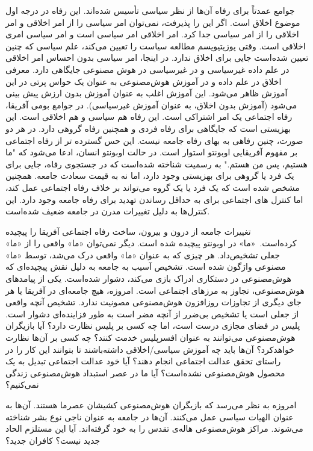 جوامع عمدتاً برای رفاه آن‌ها از نظر سیاسی تأسیس شده‌اند.
این رفاه در درجه اول موضوع اخلاق است.
اگر این را پذیرفت، نمی‌توان امر سیاسی را از امر اخلاقی و امر اخلاقی را از امر سیاسی جدا کرد.
امر اخلاقی امر سیاسی است و امر سیاسی امری اخلاقی است.
وقتی پوزیتیویسم مطالعه سیاست را تعیین می‌کند، علم سیاسی که چنین تعیین شده‌است جایی برای اخلاق ندارد.
در اینجا، امر سیاسی بدون احساس امر اخلاقی در علم داده غیرسیاسی و در غیرسیاسی در هوش مصنوعی جایگاهی دارد.
معرفی اخلاق در علم داده و در آموزش هوش‌مصنوعی به عنوان یک حواس پرتی در این آموزش ظاهر می‌شود.
این آموزش اغلب به عنوان آموزش بدون ارزش پیش بینی می‌شود (آموزش بدون اخلاق، به عنوان آموزش غیرسیاسی).
در جوامع بومی آفریقا، رفاه اجتماعی یک امر اشتراکی است.
این رفاه هم سیاسی و هم اخلاقی است.
این بهزیستی است که جایگاهی برای رفاه فردی و همچنین رفاه گروهی دارد.
در هر دو صورت، چنین رفاهی به بهای رفاه جامعه نیست.
این حس گسترده تر از رفاه اجتماعی بر مفهوم آفریقایی اوبونتو استوار است.
در حالت اوبونتو انسان، ادعا می‌شود که "ما هستیم، پس من هستم." به رسمیت شناخته شده‌است که در جستجوی رفاه، جایی برای یک فرد یا گروهی برای بهزیستی وجود دارد، اما نه به قیمت سعادت جامعه.
همچنین مشخص شده است که یک فرد یا یک گروه می‌تواند بر خلاف رفاه اجتماعی عمل کند، اما کنترل های اجتماعی برای به حداقل رساندن تهدید برای رفاه جامعه وجود دارد.
این کنترل‌ها به دلیل تغییرات مدرن در جامعه ضعیف شده‌است.

تغییرات جامعه از درون و بیرون، ساخت رفاه اجتماعی آفریقا را پیچیده کرده‌است.\ «ما» در اوبونتو پیچیده شده است.
دیگر نمی‌توان «ما» واقعی را از «ما» جعلی تشخیص‌داد.
هر چیزی که به عنوان «ما» واقعی درک می‌شد، توسط «ما» مصنوعی واژگون شده است.
تشخیص آسیب به جامعه به دلیل نقش پیچیده‌ای که هوش‌مصنوعی در دستکاری ادراک بازی می‌کند، دشوار شده‌است.
یکی از پیامدهای هوش‌مصنوعی، تجاوز به مرزهای اجتماعی است.
امروزه، هیچ جامعه‌ای در آفریقا یا هر جای دیگری از تجاوزات روزافزون هوش‌مصنوعی مصونیت ندارد.
تشخیص آنچه واقعی از جعلی است یا تشخیص بی‌ضرر از آنچه مضر است به طور فزاینده‌ای دشوار است.
پلیس در فضای مجازی درست است، اما چه کسی بر پلیس نظارت دارد؟ آیا بازیگران هوش‌مصنوعی می‌توانند به عنوان افسر‌پلیس خدمت کنند؟ چه کسی بر آن‌ها نظارت خواهد‌کرد؟ آن‌ها باید چه آموزش سیاسی/اخلاقی داشته‌باشند تا بتوانند این کار را در راستای تحقق عدالت اجتماعی انجام دهند؟ آیا خود عدالت اجتماعی تبدیل به یک محصول هوش‌مصنوعی نشده‌است؟ آیا ما در عصر استبداد هوش‌مصنوعی زندگی نمی‌کنیم؟

امروزه به نظر می‌رسد که بازیگران هوش‌مصنوعی کشیشان عصر‌ما هستند.
آن‌ها به عنوان الهیات سیاسی عمل می‌کنند.
آن‌ها در جامعه به عنوان ناجی نوع بشر شناخته می‌شوند.
مراکز هوش‌مصنوعی هاله‌ی تقدس را به خود گرفته‌اند.
آیا این مستلزم الحاد جدید نیست؟ کافران جدید؟
\newline
\newline



